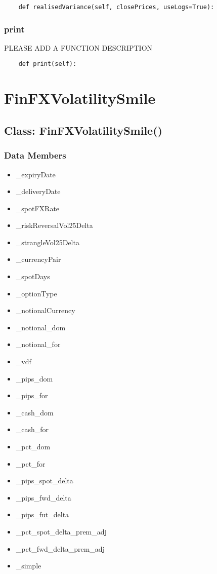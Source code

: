 \documentclass[twoside,11pt]{book}
\begin{document}
\begin{lstlisting}
    def realisedVariance(self, closePrices, useLogs=True):
\end{lstlisting}

\subsubsection*{{\bf print}}
PLEASE ADD A FUNCTION DESCRIPTION

\begin{lstlisting}
    def print(self):
\end{lstlisting}

\newpage
\section{FinFXVolatilitySmile}

\subsection*{Class: FinFXVolatilitySmile()}


\subsubsection*{Data Members}
\begin{itemize}
\item{\_expiryDate}
\item{\_deliveryDate}
\item{\_spotFXRate}
\item{\_riskReversalVol25Delta}
\item{\_strangleVol25Delta}
\item{\_currencyPair}
\item{\_spotDays}
\item{\_optionType}
\item{\_notionalCurrency}
\item{\_notional\_dom}
\item{\_notional\_for}
\item{\_vdf}
\item{\_pips\_dom}
\item{\_pips\_for}
\item{\_cash\_dom}
\item{\_cash\_for}
\item{\_pct\_dom}
\item{\_pct\_for}
\item{\_pips\_spot\_delta}
\item{\_pips\_fwd\_delta}
\item{\_pips\_fut\_delta}
\item{\_pct\_spot\_delta\_prem\_adj}
\item{\_pct\_fwd\_delta\_prem\_adj}
\item{\_simple}
\end{itemize}
\end{document}
